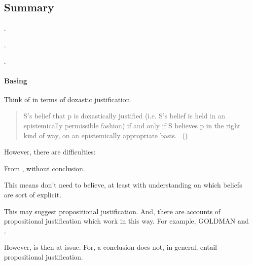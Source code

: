 


\subsection{Summary}
\label{cha:var:ros:summary}

\begin{note}
  \supportI{}.

  .

  \supportII{}.
\end{note}

\paragraph{Basing}

\begin{note}
  Think of \ros{} in terms of doxastic justification.

  \begin{quote}
    S's belief that p is doxastically justified (i.e. S's belief is held in an epistemically permissible fashion) if and only if S believes p in the right kind of way, on an epistemically appropriate basis.%
    \mbox{ }\hfill\mbox{(\citeyear{Bondy:2018tk})}
  \end{quote}

  However, there are difficulties:

  From \supportII{}, \ros{} without conclusion.

  This means don't need to believe, at least with understanding on which beliefs are sort of explicit.

  This may suggest propositional justification.
  And, there are accounts of propositional justification which work in this way.
  For example, GOLDMAN and \citeauthor{Turri:2010aa}.

  However, \supportI{} is then at issue.
  For, a conclusion does not, in general, entail propositional justification.
\end{note}

